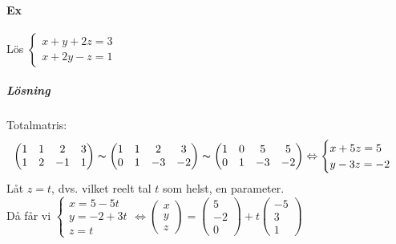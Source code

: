 \paragraph{Ex} Lös $\begin{cases}
    x+y+2z=3\\
    x+2y-z=1
\end{cases}$
\subparagraph{Lösning} Totalmatris:
\begin{equation*}
    \begin{pmatrix}
        1&1&2&3\\
        1&2&-1&1
    \end{pmatrix}
    \thicksim
    \begin{pmatrix}
        1&1&2&3\\
        0&1&-3&-2
    \end{pmatrix}
    \thicksim
    \begin{pmatrix}
        1&0&5&5\\
        0&1&-3&-2
    \end{pmatrix}
    \Leftrightarrow
    \begin{cases}
        x+5z=5\\
        y-3z=-2
    \end{cases}
\end{equation*}
Låt $z=t$, dvs. vilket reelt tal $t$ som helst, en parameter.\\
Då får vi 
$\begin{cases}
    x=5-5t\\
    y=-2+3t\\
    z=t
\end{cases}
\Leftrightarrow 
\begin{pmatrix}
    x\\y\\z
\end{pmatrix}
=
\begin{pmatrix}
    5\\-2\\0
\end{pmatrix}
+
t\begin{pmatrix}
    -5\\3\\1
\end{pmatrix}$


